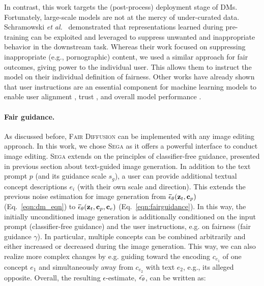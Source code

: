 \documentclass{article}%
\newcommand{\etal}{\emph{et al.}~}
\begin{document}
In contrast, this work targets the (post-process) deployment stage of DMs. 
Fortunately, large-scale models are not at the mercy of under-curated data. Schramowski \etal \cite{schramowski2022safe} demonstrated that representations learned during pre-training can be exploited and leveraged to suppress unwanted and inappropriate behavior in the downstream task. Whereas their work focused on suppressing inappropriate (e.g., pornographic) content, we used a similar approach for fair outcomes, giving power to the individual user. This allows them to instruct the model on their individual definition of fairness. Other works have already shown that user instructions are an essential component for machine learning models to enable user alignment \cite{schramowski2022large,Ouyang2022TrainingLM,friedrich22rit}, trust \cite{teso2019xil}, and overall model performance \cite{friedrich2022XIL_typo}.

\paragraph{Fair guidance.}
As discussed before, \textsc{Fair Diffusion} can be implemented with any image editing approach. In this work, we chose \textsc{Sega} \cite{brack2023Sega} as it offers a powerful interface to conduct image editing. \textsc{Sega} extends on the principles of classifier-free guidance, presented in previous section about text-guided image generation. In addition to the text prompt $p$ (and its guidance scale $s_g$), a user can provide additional textual concept descriptions $e_i$ (with their own scale and direction). This extends the previous noise estimation for image generation from $\mathbf{\Bar{\epsilon}}_\theta(\mathbf{z}_t, \mathbf{c}_p)$ (Eq.~\ref{eqn:dm_eqn}) to $\mathbf{\Bar{\epsilon}}_\theta(\mathbf{z}_t, \mathbf{c}_p, \mathbf{c}_e)$ (Eq.~\ref{eqn:fairguidance}). In this way, the initially unconditioned image generation is additionally conditioned on the input prompt (classifier-free guidance) and the user instructions, e.g. on fairness (fair guidance $\gamma$).
In particular, multiple concepts can be combined arbitrarily and either increased or decreased during the image generation. This way, we can also realize more complex changes by e.g. guiding toward the encoding $c_{e_1}$ of one concept $e_1$ and simultaneously away from $c_{e_2}$ with text $e_2$, e.g., its alleged opposite. 
Overall, the resulting $\epsilon$-estimate, $\Bar{\epsilon_\theta}$, can be written as:
\end{document}

